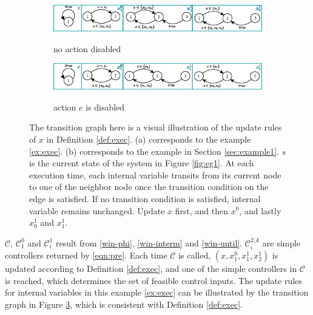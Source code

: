 \begin{example}
	\begin{figure}
		\centering
		\begin{subfigure}[b]{1\textwidth}
				\centering
				\includegraphics[width=0.7\linewidth]{pic/xupdate}
				\label{fig:xupdate1}
				\caption{no action disabled}
		\end{subfigure}
		\begin{subfigure}[b]{1\textwidth}
			\centering
			\includegraphics[width=0.7\linewidth]{pic/xupdate2}
			\label{fig:xupdate2}
			\caption{ action $ e $ is disabled}
		\end{subfigure}
		\caption{ %
			The transition graph here is a visual illustration of the update rules of $ x $ in Definition \ref{def:exec}. (a) corresponds to the example \ref{ex:exec}. (b) corresponds to the example in Section \ref{sec:example1}. $s $ is the current state of the system in Figure \ref{fig:eg1}. At each execution time, each internal variable transits from its current node to one of the neighbor node once the transition condition on the edge is satisfied. If no transition condition is satisfied, internal variable remains unchanged. Update $ x$ first, and then $ x^0 $, and lastly $ x_0^1 $ and $x^1_1 $.} 
		\label{fig:xupdate}
	\end{figure}
	
	$ \mathcal{C} $, $ \mathcal{C}_1^0 $ and $ \mathcal{C}_i^1 $ result from \eqref{win-phi}, \eqref{win-interm} and \eqref{win-until}. $ \mathcal{C}_i^{2,k} $ are simple controllers returned by \eqref{eqn:pre}. Each time $ \mathcal{C} $ is called, $ (x,x^0_1,x^1_1,x^1_2) $ is updated according to Definition \ref{def:exec}, and one of the simple controllers in $ \mathcal{C} $ is reached, which determines the set of feasible control inputs. The update rules for internal variables in this example \ref{ex:exec} can be illustrated by the transition graph in Figure \ref{fig:xupdate}, which is consistent with Definition \ref{def:exec}. %
	

\end{example}
